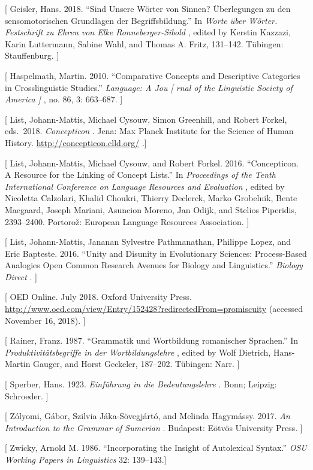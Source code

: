 \documentclass[
  english,
  a4paper,
  oneside,tablecaptionabove
]{scrbook}
\begin{document}
{[} Geisler, Hans. 2018. \enquote{Sind Unsere Wörter von Sinnen?
Überlegungen zu den sensomotorischen Grundlagen der Begriffsbildung.} In
\emph{Worte über Wörter. Festschrift zu Ehren von Elke
Ronneberger-Sibold} , edited by Kerstin Kazzazi, Karin Luttermann,
Sabine Wahl, and Thomas A. Fritz, 131--142. Tübingen: Stauffenburg. {]}

{[} Haspelmath, Martin. 2010. \enquote{Comparative Concepts and
Descriptive Categories in Crosslinguistic Studies.} \emph{Language: A
Jou {[} rnal of the Linguistic Society of America {]}} , no. 86, 3:
663--687. {]}

{[} List, Johann-Mattis, Michael Cysouw, Simon Greenhill, and Robert
Forkel, eds.~2018. \emph{Concepticon} . Jena: Max Planck Institute for
the Science of Human History. \url{http://concepticon.clld.org/} .{]}

{[} List, Johann-Mattis, Michael Cysouw, and Robert Forkel. 2016.
\enquote{Concepticon. A Resource for the Linking of Concept Lists.} In
\emph{Proceedings of the Tenth International Conference on Language
Resources and Evaluation} , edited by Nicoletta Calzolari, Khalid
Choukri, Thierry Declerck, Marko Grobelnik, Bente Maegaard, Joseph
Mariani, Asuncion Moreno, Jan Odijk, and Stelios Piperidis, 2393--2400.
Portorož: European Language Resources Association. {]}

{[} List, Johann-Mattis, Jananan Sylvestre Pathmanathan, Philippe Lopez,
and Eric Bapteste. 2016. \enquote{Unity and Disunity in Evolutionary
Sciences: Process-Based Analogies Open Common Research Avenues for
Biology and Linguistics.} \emph{Biology Direct} . {]}

{[} OED Online. July 2018. Oxford University Press.
\url{http://www.oed.com/view/Entry/152428?redirectedFrom=promiscuity}
(accessed November 16, 2018). {]}

{[} Rainer, Franz. 1987. \enquote{Grammatik und Wortbildung romanischer
Sprachen.} In \emph{Produktivitätsbegriffe in der Wortbildungslehre} ,
edited by Wolf Dietrich, Hans-Martin Gauger, and Horst Geckeler,
187--202. Tübingen: Narr. {]}

{[} Sperber, Hans. 1923. \emph{Einführung in die Bedeutungslehre} .
Bonn; Leipzig: Schroeder. {]}

{[} Zólyomi, Gábor, Szilvia Jáka-Sövegjártó, and Melinda Hagymássy.
2017. \emph{An Introduction to the Grammar of Sumerian} . Budapest:
Eötvös University Press. {]}

{[} Zwicky, Arnold M. 1986. \enquote{Incorporating the Insight of
Autolexical Syntax.} \emph{OSU Working Papers in Linguistics} 32:
139--143.{]}
\end{document}
